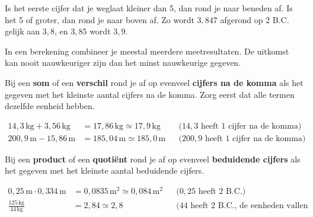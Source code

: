\documentclass{ximera}
\begin{document}
\begin{proposition}[title={Afronden}]\nl
    Is het eerste cijfer dat je weglaat kleiner dan 5, dan rond je naar beneden af. Is het 5 of groter, dan rond je naar boven af. Zo wordt $3{,}847$ afgerond op 2 B.C. gelijk aan $3{,}8$, en $3{,}85$ wordt $3{,}9$.
\end{proposition}

In een berekening combineer je meestal meerdere meetresultaten. De uitkomst kan nooit nauwkeuriger zijn dan het minst nauwkeurige gegeven.

\begin{proposition}[title={Som en verschil}]\nl
    Bij een \textbf{som} of een \textbf{verschil} rond je af op evenveel \textbf{cijfers na de komma} als het gegeven met het kleinste aantal cijfers na de komma. Zorg eerst dat alle termen dezelfde eenheid hebben.
\end{proposition}

\begin{example}[title={Som en verschil}]\nl
    \begin{align*}
        14{,}3 \, \mathrm{kg} + 3{,}56 \, \mathrm{kg} &= 17{,}86 \, \mathrm{kg} \simeq 17{,}9 \, \mathrm{kg} && \text{($14{,}3$ heeft 1 cijfer na de komma)}\\
        200{,}9 \, \mathrm{m} - 15{,}86 \, \mathrm{m} &= 185{,}04 \, \mathrm{m} \simeq 185{,}0 \, \mathrm{m} && \text{($200{,}9$ heeft 1 cijfer na de komma)}
    \end{align*}
\end{example}

\begin{proposition}[title={Product en quotiënt}]\nl
    Bij een \textbf{product} of een \textbf{quotiënt} rond je af op evenveel \textbf{beduidende cijfers} als het gegeven met het kleinste aantal beduidende cijfers.
\end{proposition}

\begin{example}[title={Product en quotiënt}]\nl
    \begin{align*}
        0{,}25 \, \mathrm{m} \cdot 0{,}334 \, \mathrm{m} &= 0{,}0835 \, \mathrm{m}^{2} \simeq 0{,}084 \, \mathrm{m}^{2} && \text{($0{,}25$ heeft 2 B.C.)}\\
        \frac{125 \, \mathrm{kg}}{44 \, \mathrm{kg}} &= 2{,}84 \simeq 2{,}8 && \text{($44$ heeft 2 B.C., de eenheden vallen weg)}
    \end{align*}
\end{example}
\end{document}
